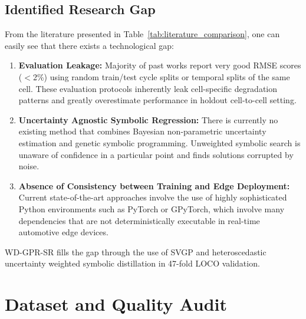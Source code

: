 \documentclass[a4paper,fleqn]{cas-sc}
\begin{document}
\subsection{Identified Research Gap}
From the literature presented in Table~\ref{tab:literature_comparison}, one can easily see that there exists a technological gap:
\begin{enumerate}
    \item \textbf{Evaluation Leakage:} Majority of past works report very good RMSE scores ($<$2\%) using random train/test cycle splits or temporal splits of the same cell. These evaluation protocols inherently leak cell-specific degradation patterns and greatly overestimate performance in holdout cell-to-cell setting.
    \item \textbf{Uncertainty Agnostic Symbolic Regression:} There is currently no existing method that combines Bayesian non-parametric uncertainty estimation and genetic symbolic programming. Unweighted symbolic search is unaware of confidence in a particular point and finds solutions corrupted by noise.
    \item \textbf{Absence of Consistency between Training and Edge Deployment:} Current state-of-the-art approaches involve the use of highly sophisticated Python environments such as PyTorch or GPyTorch, which involve many dependencies that are not deterministically executable in real-time automotive edge devices.
\end{enumerate}
WD-GPR-SR fills the gap through the use of SVGP and heteroscedastic uncertainty weighted symbolic distillation in 47-fold LOCO validation.

\section{Dataset and Quality Audit}
\end{document}

